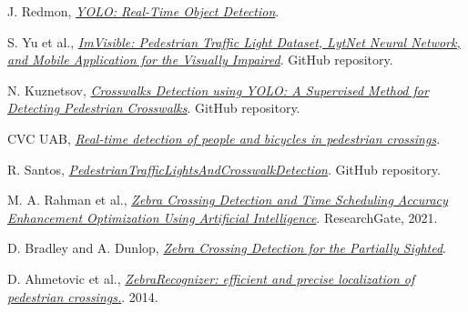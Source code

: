 \documentclass[10pt,a4paper,twocolumn,twoside]{article}
\begin{document}


\begin{thebibliography}{9}\label{sec:biblio}
	
	J. Redmon, \textit{\href{https://pjreddie.com/darknet/yolo/}{YOLO: Real-Time Object Detection}}.
	
	S. Yu et al., \textit{\href{https://github.com/samuelyu2002/ImVisible}{ImVisible: Pedestrian Traffic Light Dataset, LytNet Neural Network, and Mobile Application for the Visually Impaired}}. GitHub repository.
	
	N. Kuznetsov, \textit{\href{https://github.com/xN1ckuz/Crosswalks-Detection-using-YOLO}{Crosswalks Detection using YOLO: A Supervised Method for Detecting Pedestrian Crosswalks}}. GitHub repository.
	
	CVC UAB, \textit{\href{https://www.cvc.uab.es/portfolio/?page_id=3872}{Real-time detection of people and bicycles in pedestrian crossings}}.
	
	R. Santos, \textit{\href{https://github.com/ronaldosm/PedestrianTrafficLightsAndCrosswalkDetection}{PedestrianTrafficLightsAndCrosswalkDetection}}. GitHub repository.
	
	M. A. Rahman et al., \textit{\href{https://www.researchgate.net/publication/354299232_Zebra_Crossing_Detection_and_Time_Scheduling_Accuracy_Enhancement_Optimization_Using_Artificial_Intelligence}{Zebra Crossing Detection and Time Scheduling Accuracy Enhancement Optimization Using Artificial Intelligence}}. ResearchGate, 2021.
	
	D. Bradley and A. Dunlop, \textit{\href{https://scispace.com/pdf/zebra-crossing-detection-for-the-partially-sighted-22q9n427id.pdf}{Zebra Crossing Detection for the Partially Sighted}}.
	
	D. Ahmetovic et al., \textit{\href{https://dragan.ahmetovic.it/pdf/ahmetovic2014zebrarecognizer.pdf}{ZebraRecognizer: efficient and precise localization of pedestrian crossings.}}. 2014.
	

\end{thebibliography}
\end{document}

